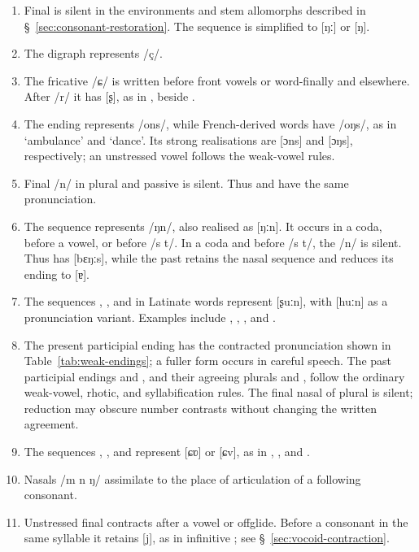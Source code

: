 \begin{enumerate}
    \item Final  is silent in the environments and stem allomorphs described in \S~\ref{sec:consonant-restoration}. The sequence  is simplified to [ŋː] or [ŋ].
    \item The digraph  represents /ç/.
    \item The fricative /ɕ/ is written  before front vowels or word-finally and  elsewhere. After /r/ it has [ʂ], as in , beside .
    \item The ending  represents /ons/, while French-derived words have /oŋs/, as in  `ambulance' and  `dance'. Its strong realisations are [ɔns] and [ɔŋs], respectively; an unstressed vowel follows the weak-vowel rules.
    \item Final /n/ in plural and passive  is silent. Thus  and  have the same pronunciation.
    \item The sequence  represents /ŋn/, also realised as [ŋːn]. It occurs in a coda, before a vowel, or before /s t/. In a coda and before /s t/, the /n/ is silent. Thus  has [bɛŋːs], while the past  retains the nasal sequence and reduces its ending to [ɐ].\label{item:gn}
    \item The sequences , , and  in Latinate words represent [ʂuːn], with [huːn] as a pronunciation variant. Examples include , , , and .
    \item The present participial ending  has the contracted pronunciation shown in Table~\ref{tab:weak-endings}; a fuller form occurs in careful speech. The past participial endings  and , and their agreeing plurals  and , follow the ordinary weak-vowel, rhotic, and syllabification rules. The final nasal of plural  is silent; reduction may obscure number contrasts without changing the written agreement.
    \item The sequences , , and  represent [ɕʋ] or [ɕv], as in , , and .
    \item Nasals /m n ŋ/ assimilate to the place of articulation of a following consonant.
    \item Unstressed final  contracts after a vowel or offglide. Before a consonant in the same syllable it retains [j], as in infinitive ; see \S~\ref{sec:vocoid-contraction}.
\end{enumerate}

